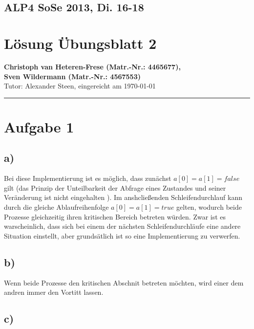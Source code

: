 \documentclass[11pt,a4paper,DIV=10,]{scrartcl}
\begin{document}
\onecolumn
\subsection*{ALP4 SoSe 2013, Di. 16-18}
\section*{Lösung Übungsblatt 2}
\textbf{Christoph van Heteren-Frese (Matr.-Nr.: 4465677), \\ Sven Wildermann (Matr.-Nr.: 4567553)}\\
Tutor: Alexander Steen, eingereicht am \today\\
\hrule

\section*{Aufgabe 1}
\subsection*{a)}
Bei diese Implementierung ist es möglich, dass zunächst $a[0]=a[1]=false$ gilt (das Prinzip der Unteilbarkeit der Abfrage eines Zustandes und seiner Veränderung ist nicht eingehalten \cite[vgl.][S. 39]{Maurer.2012}). Im anshcließenden Schleifendurchlauf kann durch die gleiche Ablaufreihenfolge $a[0]=a[1]=true$ gelten, wodurch beide Prozesse gleichzeitig ihren kritischen Bereich betreten würden. Zwar ist es warscheinlich, dass sich bei einem der nächsten Schleifendurchläufe eine andere Situation einstellt, aber grundsätlich ist so eine Implementierung zu verwerfen. 


\subsection*{b)}
Wenn beide Prozesse den kritischen Abschnit betreten möchten, wird einer dem andren immer den Vortitt lassen.
\subsection*{c)}
\end{document}
